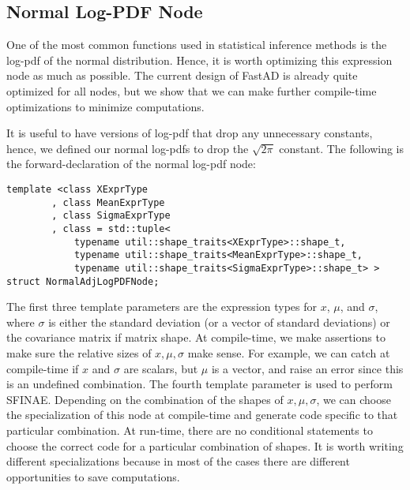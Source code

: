\subsection{Normal Log-PDF Node}\label{ssec:normal_log_pdf}

One of the most common functions used in statistical inference methods
is the log-pdf of the normal distribution.
Hence, it is worth optimizing this expression node as much as possible.
The current design of FastAD is already quite optimized for all nodes,
but we show that we can make further compile-time optimizations to minimize computations.

It is useful to have versions of log-pdf that drop any unnecessary constants,
hence, we defined our normal log-pdfs to drop the $\sqrt{2\pi}$ constant.
The following is the forward-declaration of the normal log-pdf node:
\begin{lstlisting}[style=customcpp]
template <class XExprType
        , class MeanExprType
        , class SigmaExprType
        , class = std::tuple<
            typename util::shape_traits<XExprType>::shape_t,
            typename util::shape_traits<MeanExprType>::shape_t,
            typename util::shape_traits<SigmaExprType>::shape_t> >
struct NormalAdjLogPDFNode;
\end{lstlisting}
The first three template parameters are the expression types for
$x$, $\mu$, and $\sigma$, where $\sigma$ is either the standard deviation
(or a vector of standard deviations) or the covariance matrix if matrix shape.
At compile-time, we make assertions to make sure the relative sizes of
$x, \mu, \sigma$ make sense.
For example, we can catch at compile-time 
if $x$ and $\sigma$ are scalars, but $\mu$ is a vector, and 
raise an error since this is an undefined combination.
The fourth template parameter is used to perform SFINAE.\@
Depending on the combination of the shapes of $x,\mu,\sigma$,
we can choose the specialization of this node at compile-time and 
generate code specific to that particular combination.
At run-time, there are no conditional statements to choose the
correct code for a particular combination of shapes.
It is worth writing different specializations because in most of the cases
there are different opportunities to save computations.

